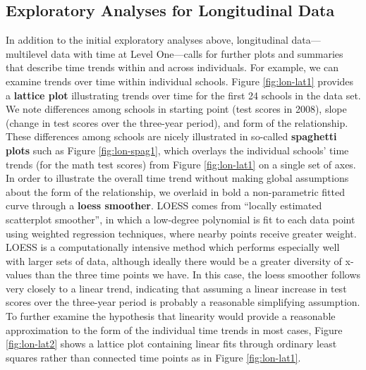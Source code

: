 \documentclass[
]{krantz}
\begin{document}
\subsection{Exploratory Analyses for Longitudinal Data}\label{longitudinalanalyses}

In addition to the initial exploratory analyses above, longitudinal data---multilevel data with time at Level One---calls for further plots and summaries that describe time trends within and across individuals. For example, we can examine trends over time within individual schools. Figure \ref{fig:lon-lat1} provides a \textbf{lattice plot}  illustrating trends over time for the first 24 schools in the data set. We note differences among schools in starting point (test scores in 2008), slope (change in test scores over the three-year period), and form of the relationship. These differences among schools are nicely illustrated in so-called \textbf{spaghetti plots}  such as Figure \ref{fig:lon-spag1}, which overlays the individual schools' time trends (for the math test scores) from Figure \ref{fig:lon-lat1} on a single set of axes. In order to illustrate the overall time trend without making global assumptions about the form of the relationship, we overlaid in bold a non-parametric fitted curve through a \textbf{loess smoother}.  LOESS comes from ``locally estimated scatterplot smoother'', in which a low-degree polynomial is fit to each data point using weighted regression techniques, where nearby points receive greater weight. LOESS is a computationally intensive method which performs especially well with larger sets of data, although ideally there would be a greater diversity of x-values than the three time points we have. In this case, the loess smoother follows very closely to a linear trend, indicating that assuming a linear increase in test scores over the three-year period is probably a reasonable simplifying assumption. To further examine the hypothesis that linearity would provide a reasonable approximation to the form of the individual time trends in most cases, Figure \ref{fig:lon-lat2} shows a lattice plot containing linear fits through ordinary least squares rather than connected time points as in Figure \ref{fig:lon-lat1}.
\end{document}
